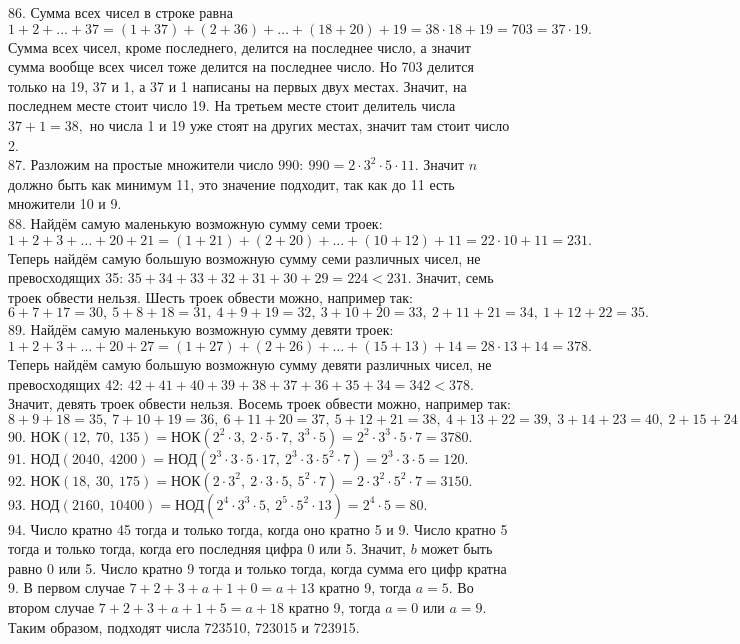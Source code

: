 86. Сумма всех чисел в строке равна $1+2+\ldots+37=(1+37)+(2+36)+\ldots+(18+20)+19=38\cdot18+19=703=37\cdot19.$ Сумма всех чисел, кроме последнего, делится на последнее число, а значит сумма вообще всех чисел тоже делится на последнее число. Но 703 делится только на 19, 37 и 1, а 37 и 1 написаны на первых двух местах. Значит, на последнем месте стоит число 19. На третьем месте стоит делитель числа $37+1=38,$ но числа 1 и 19 уже стоят на других местах, значит там стоит число 2.\\
87. Разложим на простые множители число $990:\ 990=2\cdot3^2\cdot5\cdot11.$ Значит $n$ должно быть как минимум 11, это значение подходит, так как до 11 есть множители 10 и 9.\\
88. Найдём самую маленькую возможную сумму семи троек: $1+2+3+\ldots+20+21=(1+21)+(2+20)+\ldots+(10+12)+11=22\cdot10+11=231.$ Теперь найдём самую большую возможную сумму семи различных чисел, не превосходящих 35: $35+34+33+32+31+30+29=224<231.$ Значит, семь троек обвести нельзя. Шесть троек обвести можно, например так:
$6+7+17=30,\ 5+8+18=31,\ 4+9+19=32,\ 3+10+20=33,\ 2+11+21=34,\ 1+12+22=35.$\\
89. Найдём самую маленькую возможную сумму девяти троек: $1+2+3+\ldots+20+27=(1+27)+(2+26)+\ldots+(15+13)+14=28\cdot13+14=378.$ Теперь найдём самую большую возможную сумму девяти различных чисел, не превосходящих 42: $42+41+40+39+38+37+36+35+34=342<378.$ Значит, девять троек обвести нельзя. Восемь троек обвести можно, например так:
$8+9+18=35,\ 7+10+19=36,\ 6+11+20=37,\ 5+12+21=38,\ 4+13+22=39,\ 3+14+23=40,\ 2+15+24=41,\ 1+16+25=42.$\\
90. НОК$(12,\ 70,\ 135) =$НОК$(2^2\cdot3,\ 2\cdot5\cdot7,\ 3^3\cdot5)=2^2\cdot3^3\cdot5\cdot7=3780.$\\
91. НОД$(2040,\ 4200)=$НОД$(2^3\cdot3\cdot5\cdot17,\ 2^3\cdot3\cdot5^2\cdot7)=2^3\cdot3\cdot5=120.$\\
92. НОК$(18,\ 30,\ 175)=$НОК$(2\cdot3^2,\ 2\cdot3\cdot5,\ 5^2\cdot7)=2\cdot3^2\cdot5^2\cdot7=3150.$\\
93. НОД$(2160,\ 10400)=$НОД$(2^4\cdot3^3\cdot5,\ 2^5\cdot5^2\cdot13)=2^4\cdot5=80.$\\
94. Число кратно 45 тогда и только тогда, когда оно кратно 5 и 9. Число кратно 5 тогда и только тогда, когда его последняя цифра 0 или 5. Значит, $b$ может быть равно 0 или 5. Число кратно 9 тогда и только тогда, когда сумма его цифр кратна 9. В первом случае $7+2+3+a+1+0=a+13$ кратно 9, тогда $a=5.$ Во втором случае
$7+2+3+a+1+5=a+18$ кратно 9, тогда $a=0$ или $a=9.$ Таким образом, подходят числа 723510, 723015 и 723915.\\

